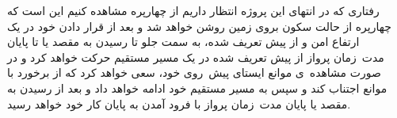 رفتاری که در انتهای این پروژه انتظار داریم از چهارپره مشاهده کنیم این است که چهارپره از حالت سکون بروی زمین روشن خواهد شد و بعد از قرار دادن خود در یک ارتفاع امن و از پیش تعریف شده، به سمت جلو تا رسیدن به مقصد یا تا پایان مدت\ زمان پرواز از پیش تعریف شده در یک مسیر مستقیم حرکت خواهد کرد و در صورت مشاهده\ ی موانع ایستای پیش\ روی خود، سعی خواهد کرد که از برخورد با موانع اجتناب کند و سپس به مسیر مستقیم خود ادامه خواهد داد و بعد از رسیدن به مقصد یا پایان مدت\ زمان پرواز با فرود آمدن به پایان کار خود خواهد رسید.